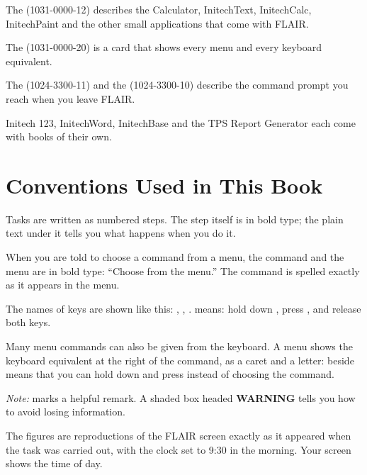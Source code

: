 The  (1031-0000-12)
describes the Calculator, InitechText\tm{}, InitechCalc\tm{},
InitechPaint\tm{} and the other small applications that come with FLAIR.

The 
(1031-0000-20) is a card that shows every menu and every keyboard
equivalent.

The  (1024-3300-11)
and the  (1024-3300-10) describe the command
prompt you reach when you leave FLAIR.

Initech 123, InitechWord, InitechBase and the TPS Report Generator each come
with books of their own.

\section{Conventions Used in This Book}
Tasks are written as numbered steps.  The step itself is in
bold type; the plain text under it tells you what happens when you do it.

When you are told to choose a command from a menu,
the command and the menu are in bold type: ``Choose 
from the  menu.''  The command is spelled exactly as it
appears in the menu.

The names of keys are shown like this: ,
, .   means: hold down , press
, and release both keys.

Many menu commands can also be given from
the keyboard.  A menu shows the keyboard equivalent at the right of the
command, as a caret and a letter:  beside 
means that you can hold down  and press  instead of
choosing the command.

\textit{Note:} marks a helpful remark.  A
shaded box headed \textbf{WARNING} tells you how to avoid losing
information.

The figures are reproductions of the FLAIR screen exactly
as it appeared when the task was carried out, with the clock set to 9:30
in the morning.  Your screen shows the time of day.
